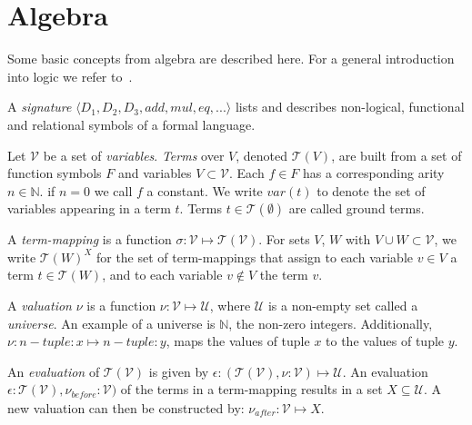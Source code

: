 \section{Algebra}\label{sec:algebra}

Some basic concepts from algebra are described here. For a general introduction into logic we refer to~\cite{Huth:logic}.

A \textit{signature} $\langle D_1, D_2, D_3, add, mul, eq, ...\rangle$ lists and describes non-logical, functional and relational symbols of a formal language.  
 
Let $\mathcal{V}$ be a set of \textit{variables}. \textit{Terms} over $V$, denoted $\mathcal{T}(V)$, are built from a set of function symbols $F$ and variables $V \subset \mathcal{V}$. Each $f\in F$ has a corresponding arity $n\in \mathbb{N}$. if $n = 0$ we call $f$ a constant. We write $var(t)$ to denote the set of variables appearing in a term $t$. Terms $t\in \mathcal{T}(\emptyset)$ are called ground terms.

A \textit{term-mapping} is a function $\sigma:\mathcal{V} \mapsto \mathcal{T}(\mathcal{V})$. For sets $V$, $W$ with $V \cup W \subset \mathcal{V}$, we write $\mathcal{T}(W)^X$ for the set of term-mappings that assign to each variable $v\in V$ a term $t\in \mathcal{T}(W)$, and to each variable $v \not\in V$ the term $v$.

A \textit{valuation} $\nu$ is a function $\nu:\mathcal{V} \mapsto \mathcal{U}$, where $\mathcal{U}$ is a non-empty set called a \textit{universe}. An example of a universe is $\mathbb{N}$, the non-zero integers. Additionally, $\nu:\mathit{n-tuple:x} \mapsto \mathit{n-tuple:y}$, maps the values of tuple $x$ to the values of tuple $y$.

An \textit{evaluation} of $\mathcal{T}(\mathcal{V})$ is given by $\epsilon:(\mathcal{T}(\mathcal{V}),\nu:\mathcal{V}) \mapsto \mathcal{U}$. An evaluation $\epsilon:\mathcal{T}(\mathcal{V}),\nu_\mathit{before}:\mathcal{V})$ of the terms in a term-mapping results in a set $X \subseteq \mathcal{U}$. A new valuation can then be constructed by: $\nu_\mathit{after}:\mathcal{V} \mapsto X$.
